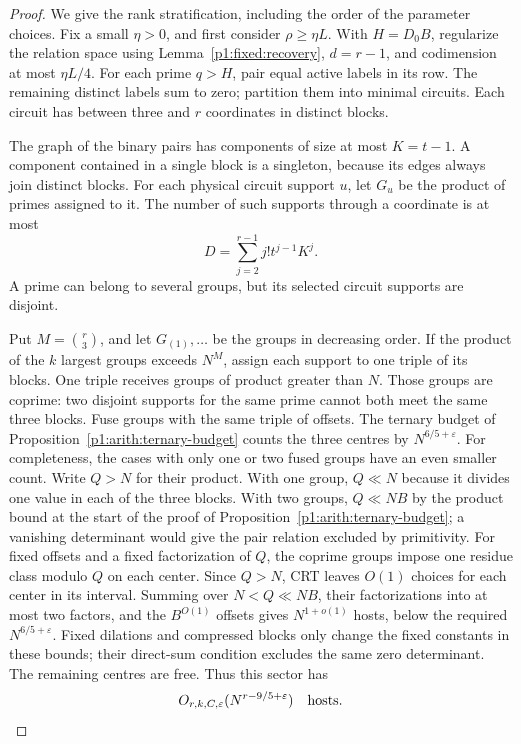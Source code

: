 \begin{proof}
We give the rank stratification, including the order of
the parameter choices. Fix a small \(\eta>0\), and first
consider \(\rho\ge\eta L\). With \(H=D_0B\), regularize
the relation space using Lemma~\ref{p1:fixed:recovery},
\(d=r-1\), and codimension at most \(\eta L/4\).
For each prime \(q>H\), pair equal active labels in its
row. The remaining distinct labels sum to zero; partition
them into minimal circuits. Each circuit has between
three and \(r\) coordinates in distinct blocks.

The graph of the binary pairs has components of size
at most \(K=t-1\). A component contained in a single
block is a singleton, because its edges always join
distinct blocks. For each physical circuit support \(u\),
let \(G_u\) be the product of primes assigned to it.
The number of such supports through a coordinate is at
most
\[
 D=\sum_{j=2}^{r-1}j!t^{j-1}K^j .
\]
A prime can belong to several groups, but its selected
circuit supports are disjoint.

Put \(M=\binom r3\), and let \(G_{(1)},\ldots\) be the
groups in decreasing order. If the product of the
\(k\) largest groups exceeds \(N^M\), assign each support
to one triple of its blocks. One triple receives groups
of product greater than \(N\). Those groups are coprime:
two disjoint supports for the same prime cannot both
meet the same three blocks. Fuse groups with the same
triple of offsets. The ternary budget
of Proposition~\ref{p1:arith:ternary-budget} counts the three
centres by \(N^{6/5+\varepsilon}\).
For completeness, the cases with only one or two fused groups have an
even smaller count.  Write $Q>N$ for their product.  With one group,
$Q\ll N$ because it divides one value in each of the three blocks.
With two groups, $Q\ll NB$ by the product bound at the start of the
proof of Proposition~\ref{p1:arith:ternary-budget}; a vanishing determinant
would give the pair relation excluded by primitivity.  For fixed offsets
and a fixed factorization of $Q$, the coprime groups impose one residue
class modulo $Q$ on each center.  Since $Q>N$, CRT leaves $O(1)$
choices for each center in its interval.  Summing over
$N<Q\ll NB$, their factorizations into at most two factors, and the
$B^{O(1)}$ offsets gives $N^{1+o(1)}$ hosts, below the required
$N^{6/5+\varepsilon}$.  Fixed dilations and compressed blocks only
change the fixed constants in these bounds; their direct-sum condition
excludes the same zero determinant.
The remaining centres are free. Thus this sector has
\begin{equation}
 O_{r,k,C,\varepsilon}(N^{r-9/5+\varepsilon})
 \quad\hbox{hosts}.
 \label{p1:fixed:group-tail}
\end{equation}


\end{proof}
